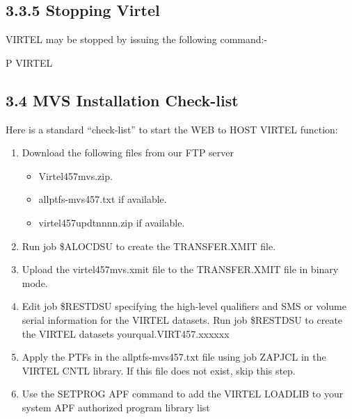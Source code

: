 \documentclass[letterpaper,10pt,english]{sphinxmanual}
\begin{document}
\subsection{3.3.5 Stopping Virtel}
\label{\detokenize{Installation_Guide:stopping-virtel}}
VIRTEL may be stopped by issuing the following command:-

P VIRTEL


\subsection{3.4 MVS Installation Check-list}
\label{\detokenize{Installation_Guide:mvs-installation-check-list}}
Here is a standard “check-list” to start the WEB to HOST VIRTEL function:
\begin{enumerate}
\item {} 
Download the following files from our FTP server 
\begin{itemize}
\item {} 
Virtel457mvs.zip.

\item {} 
allptfs-mvs457.txt if available.

\item {} 
virtel457updtnnnn.zip if available.

\end{itemize}

\item {} 
Run job \$ALOCDSU to create the TRANSFER.XMIT file.

\item {} 
Upload the virtel457mvs.xmit file to the TRANSFER.XMIT file in binary    mode.

\item {} 
Edit job \$RESTDSU specifying the high-level qualifiers and SMS or volume serial information for the VIRTEL datasets. Run job \$RESTDSU to create the VIRTEL datasets yourqual.VIRT457.xxxxxx

\item {} 
Apply the PTFs in the allptfs-mvs457.txt file using job ZAPJCL in the VIRTEL CNTL library. If this file does not exist, skip this step.

\item {} 
Use the SETPROG APF command to add the VIRTEL LOADLIB to your system APF authorized program library list

\end{enumerate}
\end{document}
